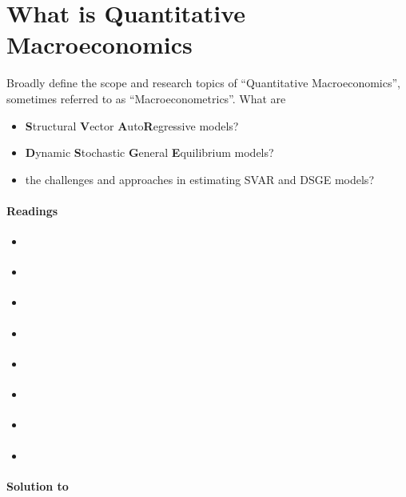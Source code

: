 \section[What is Quantitative Macroeconomics]{What is Quantitative Macroeconomics\label{ex:QuantitativeMacroeconomics}}
Broadly define the scope and research topics of \enquote{Quantitative Macroeconomics},
  sometimes referred to as \enquote{Macroeconometrics}. What are
\begin{itemize}
  \item \textbf{S}tructural \textbf{V}ector \textbf{A}uto\textbf{R}egressive models?
  \item \textbf{D}ynamic \textbf{S}tochastic \textbf{G}eneral \textbf{E}quilibrium models?
  \item the challenges and approaches in estimating SVAR and DSGE models?  
\end{itemize}

\paragraph{Readings}
\begin{itemize}
  \item \textcite{Cantore.Gabriel.Levine.EtAl_2013_ScienceArtDSGE}
  \item \textcite{Christiano.Eichenbaum.Trabandt_2018_DSGEModels}
	\item \textcite{Fernandez-Villaverde.Rubio-Ramirez_2010_StructuralVectorAutoregressions}
	\item \textcite{Guerron-Quintana.Nason_2013_BayesianEstimationDSGE}
	\item \textcite[Ch. 1]{Herbst.Schorfheide_2016_BayesianEstimationDSGE}
	\item \textcite{Kilian_2013_StructuralVectorAutoregressions}
	\item \textcite[Ch. 1, Ch. 6]{Kilian.Lutkepohl_2017_StructuralVectorAutoregressive}
	\item \textcite{Schorfheide_2010_BayesianMethodsMacroeconometrics}
\end{itemize}

\begin{solution}\textbf{Solution to }
\ifDisplaySolutions

\fi
\newpage
\end{solution}